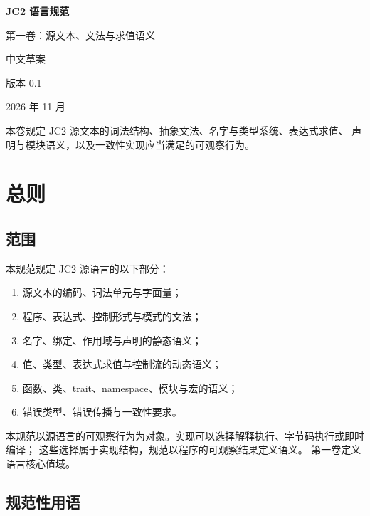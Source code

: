 \documentclass[UTF8,12pt]{ctexart}
\begin{document}
\begin{titlepage}
  \centering
  \vspace*{3.2cm}
  {\Huge\bfseries JC2 语言规范\par}
  \vspace{0.8cm}
  {\LARGE 第一卷：源文本、文法与求值语义\par}
  \vspace{2.2cm}
  {\Large 中文草案\par}
  \vspace{0.6cm}
  {\large 版本 0.1\par}
  \vspace{0.4cm}
  {\large 2026 年 11 月\par}
  \vfill
  \begin{minipage}{0.78\textwidth}
    \small
    \noindent
    本卷规定 JC2 源文本的词法结构、抽象文法、名字与类型系统、表达式求值、
    声明与模块语义，以及一致性实现应当满足的可观察行为。
  \end{minipage}
\end{titlepage}

\tableofcontents
\newpage

\section{总则}

\subsection{范围}

本规范规定 JC2 源语言的以下部分：

\begin{enumerate}
  \item 源文本的编码、词法单元与字面量；
  \item 程序、表达式、控制形式与模式的文法；
  \item 名字、绑定、作用域与声明的静态语义；
  \item 值、类型、表达式求值与控制流的动态语义；
  \item 函数、类、trait、namespace、模块与宏的语义；
  \item 错误类型、错误传播与一致性要求。
\end{enumerate}

本规范以源语言的可观察行为为对象。实现可以选择解释执行、字节码执行或即时编译；
这些选择属于实现结构，规范以程序的可观察结果定义语义。
第一卷定义语言核心值域。

\subsection{规范性用语}
\end{document}
